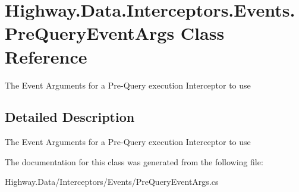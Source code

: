 \hypertarget{class_highway_1_1_data_1_1_interceptors_1_1_events_1_1_pre_query_event_args}{\section{Highway.\-Data.\-Interceptors.\-Events.\-Pre\-Query\-Event\-Args Class Reference}
\label{class_highway_1_1_data_1_1_interceptors_1_1_events_1_1_pre_query_event_args}
}


The Event Arguments for a Pre-\/\-Query execution Interceptor to use  




\subsection{Detailed Description}
The Event Arguments for a Pre-\/\-Query execution Interceptor to use 



The documentation for this class was generated from the following file\-:\begin{DoxyCompactItemize}
\item 
Highway.\-Data/\-Interceptors/\-Events/Pre\-Query\-Event\-Args.\-cs\end{DoxyCompactItemize}
